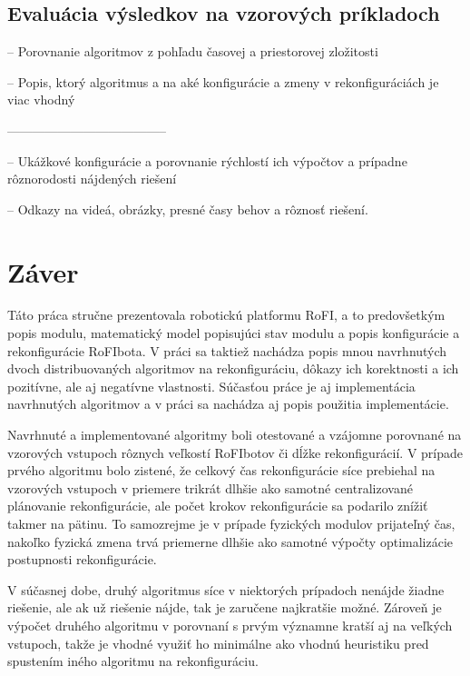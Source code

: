 \documentclass[
  digital, %
  oneside, %
  notable,   %
  lof,     %
  nolot,     %
]{fithesis3}
\begin{document}
\section{Evaluácia výsledkov na vzorových príkladoch}
-- Porovnanie algoritmov z pohľadu časovej a priestorovej zložitosti

-- Popis, ktorý algoritmus a na aké konfigurácie a zmeny v rekonfiguráciách je viac vhodný


--------------------------------------


-- Ukážkové konfigurácie a porovnanie rýchlostí ich výpočtov a prípadne rôznorodosti nájdených riešení

-- Odkazy na videá, obrázky, presné časy behov a rôznosť riešení. 






\chapter{Záver}
Táto práca stručne prezentovala robotickú platformu RoFI, a to predovšetkým popis modulu, matematický model popisujúci stav modulu a popis konfigurácie a rekonfigurácie RoFIbota. V práci sa taktiež nachádza popis mnou navrhnutých dvoch distribuovaných algoritmov na rekonfiguráciu, dôkazy ich korektnosti a ich pozitívne, ale aj negatívne vlastnosti. Súčasťou práce je aj implementácia navrhnutých algoritmov a v práci sa nachádza aj popis použitia implementácie. 

Navrhnuté a implementované algoritmy boli otestované a vzájomne porovnané na vzorových vstupoch rôznych veľkostí RoFIbotov či dĺžke rekonfigurácií. V prípade prvého algoritmu bolo zistené, že celkový čas rekonfigurácie síce prebiehal na vzorových vstupoch v priemere trikrát dlhšie ako samotné centralizované plánovanie rekonfigurácie, ale počet krokov rekonfigurácie sa podarilo znížiť takmer na pätinu. To samozrejme je v prípade fyzických modulov prijateľný čas, nakoľko fyzická zmena trvá priemerne dlhšie ako samotné výpočty optimalizácie postupnosti rekonfigurácie. 

V súčasnej dobe, druhý algoritmus síce v niektorých prípadoch nenájde žiadne riešenie, ale ak už riešenie nájde, tak je zaručene najkratšie možné. Zároveň je výpočet druhého algoritmu v porovnaní s prvým významne kratší aj na veľkých vstupoch, takže je vhodné využiť ho minimálne ako vhodnú heuristiku pred spustením iného algoritmu na rekonfiguráciu. 
\end{document}
